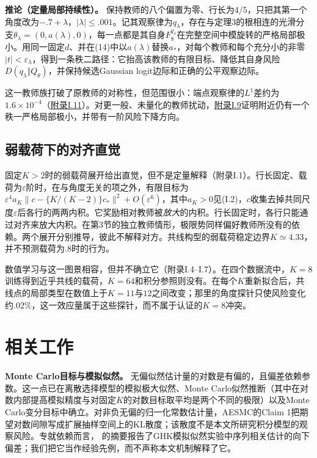 \documentclass[11pt,a4paper]{article}
\begin{document}
\protect{}\label{quantitative-persistence-corollary}
\textbf{推论（定量局部持续性）。}
保持教师的八个偏置为零、行长为\(4/5\)，只把其第一个角度改为\(-.7+\lambda\)，\(|\lambda|\le.001\)。记其观察律为\(q_\lambda\)，存在与定理3的根相连的光滑分支\(\theta_\lambda=(0,a(\lambda),0)\)，每一点都是其自身\(F_8^{q_\lambda}\)在完整空间中模旋转的严格局部极小。用同一固定\(d\)、并在(14)中以\(a(\lambda)\)替换\(a_*\)，对每个教师和每个充分小的非零\(|t|<\varepsilon_\lambda\)，得到一条秩二路径：它抬高该教师的有限目标、降低其自身风险\(D(q_\lambda\Vert Q_\theta)\)，并保持候选Gaussian
logit边际和正确的公平观察边际。

这一教师族打破了原教师的对称性，但范围很小：端点观察律的\(L^1\)差约为\(1.6\times10^{-4}\)（\hyperref[teacher-family-full-statement]{附录I.11}）。对更一般、未量化的教师扰动，\hyperref[local-persistence]{附录I.9}证明附近仍有一个秩一严格局部极小，并带有一阶风险下降方向。

\subsection{弱载荷下的对齐直觉}\label{ux5f31ux8f7dux8377ux4e0bux7684ux5bf9ux9f50ux76f4ux89c9}

固定\(K>2\)时的弱载荷展开给出直觉，但不是定量解释（附录I.1）。行长固定、载荷为\(\varepsilon\)阶时，在与角度无关的项之外，有限目标为\(\varepsilon^4a_K\|c-\{K/(K-2)\}c_*\|^2+O(\varepsilon^6)\)，其中\(a_K>0\)见(I.2)，\(c\)收集去掉共同尺度\(\varepsilon\)后各行的两两内积。它奖励相对教师被\emph{放大}的内积。行长固定时，各行只能通过对齐来放大内积。在第3节的独立教师情形，极限势同样偏好教师所没有的依赖。两个展开分别推导，彼此不解释对方。共线构型的弱载荷稳定边界\(K\simeq4.33\)，并不预测载荷为\(.8\)时的行为。

数值学习与这一图景相容，但并不确立它（附录I.4--I.7）。在四个数据流中，\(K=8\)训练得到近乎共线的载荷，\(K=64\)和积分参照则没有。在每个\(K\)重新拟合后，共线点的局部类型在数值上于\(K=11\)与\(12\)之间改变；那里的角度探针只使风险变化约\(.02\%\)，这一效应量属于这些探针，而不属于认证的\(K=8\)冲突。

\section{相关工作}\label{ux76f8ux5173ux5de5ux4f5c}

\textbf{Monte Carlo目标与模拟似然。}
无偏似然估计量的对数是有偏的，且偏差依赖参数。这一点已在离散选择模型的模拟极大似然\citep{lee1995}、Monte
Carlo似然推断\citep{sung2007}（其中在对数内部提高模拟精度与对固定\(K\)的对数目标取平均是两个不同的极限）以及Monte
Carlo变分目标\citep{maddison2017}中确立。对非负无偏的归一化常数估计量，AESMC的Claim
1把期望对数间隙写成扩展抽样空间上的KL散度\citep{le2018aesmc}；该散度不是本文所研究积分模型的观察风险。专就依赖而言，
\citet{geweke1997}
的摘要报告了GHK模拟似然实验中序列相关估计的向下偏差；我们把它当作经验先例，而不声称本文机制解释了它。
\end{document}
